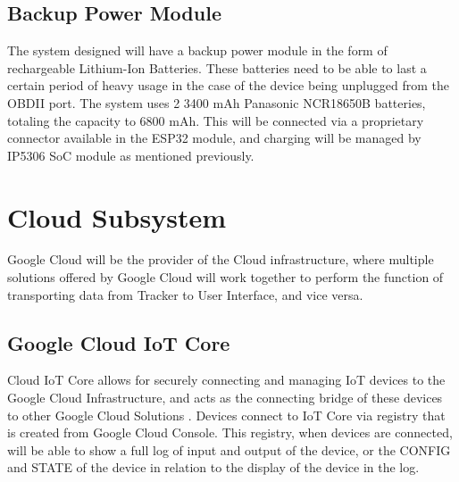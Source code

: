 \documentclass[conference]{IEEEtran}
\begin{document}
\subsection{Backup Power Module}
The system designed will have a backup power module in the form of rechargeable Lithium-Ion Batteries. These batteries need to be able to last a certain period of heavy usage in the case of the device being unplugged from the OBDII port. 
The system uses 2 3400 mAh Panasonic NCR18650B batteries, totaling the capacity to 6800 mAh. This will be connected via a proprietary connector available in the ESP32 module, and charging will be managed by IP5306 SoC module as mentioned 
previously. 

\section{Cloud Subsystem}
Google Cloud will be the provider of the Cloud infrastructure, where multiple solutions offered by Google Cloud will work together to perform the function of transporting data from Tracker to User Interface, and vice versa.

\subsection{Google Cloud IoT Core}
Cloud IoT Core allows for securely connecting and managing IoT devices to the Google Cloud Infrastructure, and acts as the connecting bridge of these devices to other Google Cloud Solutions \cite{iotcorewebsite}. Devices connect to IoT Core via registry that is created from Google Cloud Console. This registry, when devices are connected, will be able to show a full log of input and output of the device, or the CONFIG and STATE of the device in relation to the display of the device in the log. 
\end{document}
